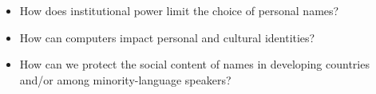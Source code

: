 \begin{itemize}
\item How does institutional power limit the choice of personal names?
\item How can computers impact personal and cultural identities?
\item How can we protect the social content of names in developing countries
and/or among minority-language speakers?
\end{itemize}
